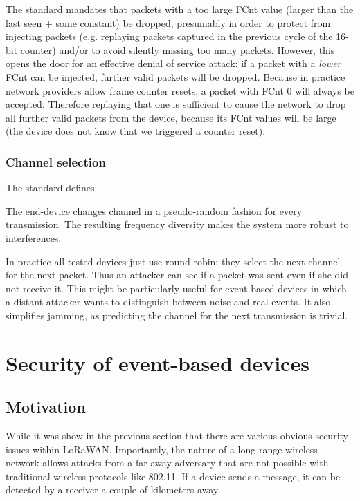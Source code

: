 The standard mandates that packets with a too large FCnt value (larger than the last seen + some constant) be dropped, presumably in order to protect from injecting packets (e.g. replaying packets captured in the previous cycle of the 16-bit counter) and/or to avoid silently missing too many packets. However, this opens the door for an effective denial of service attack: if a packet with a \textit{lower} FCnt can be injected, further valid packets will be dropped. Because in practice network providers allow frame counter resets, a packet with FCnt 0 will always be accepted. Therefore replaying that one is sufficient to cause the network to drop all further valid packets from the device, because its FCnt values will be large (the device does not know that we triggered a counter reset).

\subsection{Channel selection}
\label{sec.channel}

The standard defines:

\begin{displayquote}
The end-device changes channel in a pseudo-random fashion for every
transmission. The resulting frequency diversity makes the system more
robust to interferences.
\end{displayquote}

In practice all tested devices just use round-robin: they select the next channel for the
next packet. Thus an attacker can see if a packet was sent even if she did not receive it.
This might be particularly useful for event based devices in which a distant
attacker wants to distinguish between noise and real events. It also simplifies jamming, as predicting the channel for the next transmission is trivial.

\hypertarget{h.1a3modh2fhpw}{\chapter{\texorpdfstring{{Security of
event-based
devices}}{Security of event-based devices}}\label{h.1a3modh2fhpw}}

\hypertarget{h.kyg6ihxrou88}{\section{\texorpdfstring{{Motivation}}{Motivation}}\label{h.kyg6ihxrou88}}

While it was show in the previous section that there are various
obvious security issues within LoRaWAN. Importantly, the nature of a long range
wireless network allows attacks from a far away adversary that are not
possible with traditional wireless protocols like 802.11. If a device
sends a message, it can be detected by a receiver a couple of kilometers away.


